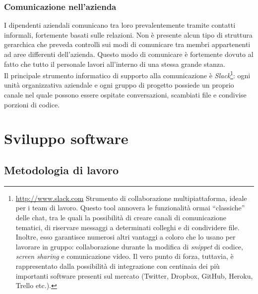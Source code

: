			\subsubsection{Comunicazione nell'azienda}
				I dipendenti aziendali comunicano tra loro prevalentemente tramite contatti informali, fortemente basati sulle
				relazioni. Non è presente alcun tipo di struttura gerarchica che preveda controlli sui modi di comunicare tra membri
				appartenenti ad aree differenti dell'azienda. Questo modo di comunicare è fortemente dovuto al fatto che tutto il
				personale lavori all'interno di una stessa grande stanza.\\
				Il principale strumento informatico di supporto alla comunicazione è \emph{Slack}\footnote{\url{http://www.slack.com} Strumento di collaborazione multipiattaforma, ideale per i team di lavoro. Questo tool annovera le funzionalità
ormai “classiche” delle chat, tra le quali la possibilità di creare canali di comunicazione tematici, di riservare messaggi a determinati colleghi e
di condividere file. Inoltre, esso garantisce numerosi altri vantaggi a coloro che lo usano per lavorare in gruppo: collaborazione durante la modifica
di \emph{snippet} di codice, \emph{screen sharing} e comunicazione video. Il vero punto di forza, tuttavia, è rappresentato dalla possibilità di
integrazione con centinaia dei più importanti software presenti sul mercato (Twitter, Dropbox, GitHub, Heroku, Trello etc.).}:
				ogni unità organizzativa aziendale e ogni gruppo di progetto possiede un proprio canale nel quale possono essere
				ospitate conversazioni, scambiati file e condivise porzioni di codice.
	\section{Sviluppo software}
		\subsection{Metodologia di lavoro}
